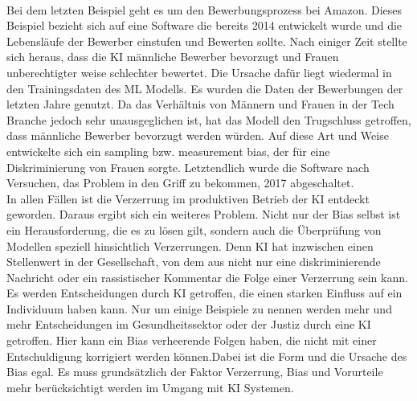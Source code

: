 \begin{onehalfspace}
        \\
        Bei dem letzten Beispiel geht es um den Bewerbungsprozess bei Amazon. Dieses Beispiel bezieht sich auf eine Software die bereits 2014 entwickelt wurde und die Lebensläufe der Bewerber einstufen und Bewerten sollte. Nach einiger Zeit stellte sich heraus, dass die \ac*{KI} männliche Bewerber bevorzugt und Frauen unberechtigter weise schlechter bewertet. Die Ursache dafür liegt wiedermal in den Trainingsdaten des \ac*{ML} Modells. Es wurden die Daten der Bewerbungen der letzten Jahre genutzt. Da das Verhältnis von Männern und Frauen in der Tech Branche jedoch sehr unausgeglichen ist, hat das Modell den Trugschluss getroffen, dass männliche Bewerber bevorzugt werden würden. Auf diese Art und Weise entwickelte sich ein sampling bzw. measurement bias, der für eine Diskriminierung von Frauen sorgte. Letztendlich wurde die Software nach Versuchen, das Problem in den Griff zu bekommen, 2017 abgeschaltet.\cite{Cremers2019}\cite{IncidentDatabase2015_37}
        \\
        In allen Fällen ist die Verzerrung im produktiven Betrieb der \ac*{KI} entdeckt geworden. Daraus ergibt sich ein weiteres Problem. Nicht nur der Bias selbst ist ein Herausforderung, die es zu lösen gilt, sondern auch die Überprüfung von Modellen speziell hinsichtlich Verzerrungen. Denn \ac*{KI} hat inzwischen einen Stellenwert in der Gesellschaft, von dem aus nicht nur eine diskriminierende Nachricht oder ein rassistischer Kommentar die Folge einer Verzerrung sein kann. Es werden Entscheidungen durch \ac*{KI} getroffen, die einen starken Einfluss auf ein Individuum haben kann. Nur um einige Beispiele zu nennen werden mehr und mehr Entscheidungen im Gesundheitssektor oder der Justiz durch eine \ac*{KI} getroffen. Hier kann ein Bias verheerende Folgen haben, die nicht mit einer Entschuldigung korrigiert werden können.\cite{hagendorff2019maschinelles}Dabei ist die Form und die Ursache des Bias egal. Es muss grundsätzlich der Faktor Verzerrung, Bias und Vorurteile mehr berücksichtigt werden im Umgang mit \ac*{KI} Systemen.\cite{Drew2019}
    

\end{onehalfspace}
